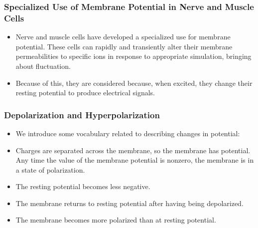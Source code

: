 \documentclass{article}
\numberwithin{equation}{section}
\begin{document}
\subsubsection{Specialized Use of Membrane Potential in Nerve and Muscle Cells}
\begin{itemize}
    \item Nerve and muscle cells have developed a specialized use for membrane potential. These cells can rapidly and transiently alter their membrane permeabilities to specific ions in response to appropriate simulation, bringing about fluctuation.
    \item Because of this, they are considered  because, when excited, they change their resting potential to produce electrical signals.
\end{itemize}
\subsubsection{Depolarization and Hyperpolarization}
\begin{itemize}
    \item We introduce some vocabulary related to describing changes in potential:
    \item {} Charges are separated across the membrane, so the membrane has potential. Any time the value of the membrane potential is nonzero, the membrane is in a state of polarization.
    \item {} The resting potential becomes less negative.
    \item {} The membrane returns to resting potential after having being depolarized.
    \item {} The membrane becomes more polarized than at resting potential.
\end{itemize}
\end{document}
